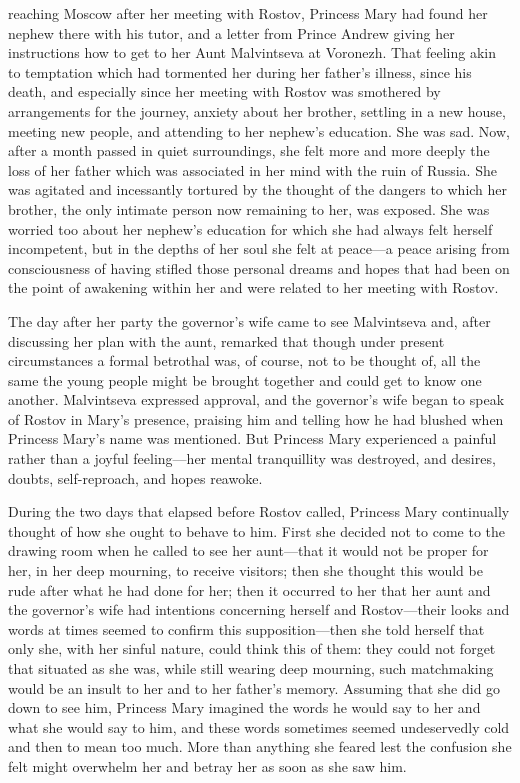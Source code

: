  reaching Moscow after her meeting with Rostov, Princess Mary
had found her nephew there with his tutor, and a letter from
Prince Andrew giving her instructions how to get to her Aunt
Malvintseva at Voronezh.  That feeling akin to temptation which
had tormented her during her father's illness, since his death,
and especially since her meeting with Rostov was smothered by
arrangements for the journey, anxiety about her brother, settling
in a new house, meeting new people, and attending to her nephew's
education. She was sad. Now, after a month passed in quiet
surroundings, she felt more and more deeply the loss of her
father which was associated in her mind with the ruin of
Russia. She was agitated and incessantly tortured by the thought
of the dangers to which her brother, the only intimate person now
remaining to her, was exposed. She was worried too about her
nephew's education for which she had always felt herself
incompetent, but in the depths of her soul she felt at peace---a
peace arising from consciousness of having stifled those personal
dreams and hopes that had been on the point of awakening within
her and were related to her meeting with Rostov.

The day after her party the governor's wife came to see
Malvintseva and, after discussing her plan with the aunt,
remarked that though under present circumstances a formal
betrothal was, of course, not to be thought of, all the same the
young people might be brought together and could get to know one
another. Malvintseva expressed approval, and the governor's wife
began to speak of Rostov in Mary's presence, praising him and
telling how he had blushed when Princess Mary's name was
mentioned. But Princess Mary experienced a painful rather than a
joyful feeling---her mental tranquillity was destroyed, and
desires, doubts, self-reproach, and hopes reawoke.

During the two days that elapsed before Rostov called, Princess
Mary continually thought of how she ought to behave to him. First
she decided not to come to the drawing room when he called to see
her aunt---that it would not be proper for her, in her deep
mourning, to receive visitors; then she thought this would be
rude after what he had done for her; then it occurred to her that
her aunt and the governor's wife had intentions concerning
herself and Rostov---their looks and words at times seemed to
confirm this supposition---then she told herself that only she,
with her sinful nature, could think this of them: they could not
forget that situated as she was, while still wearing deep
mourning, such matchmaking would be an insult to her and to her
father's memory. Assuming that she did go down to see him,
Princess Mary imagined the words he would say to her and what she
would say to him, and these words sometimes seemed undeservedly
cold and then to mean too much. More than anything she feared
lest the confusion she felt might overwhelm her and betray her as
soon as she saw him.


